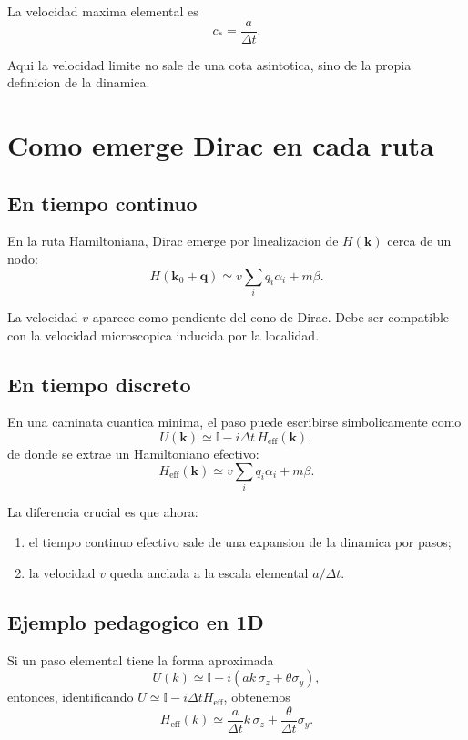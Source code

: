 La velocidad maxima elemental es
\begin{equation}
c_\ast = \frac{a}{\Delta t}.
\label{c20:eq:cstar}
\end{equation}

Aqui la velocidad limite no sale de una cota asintotica, sino de la propia definicion de la dinamica.

\section{Como emerge Dirac en cada ruta}
\subsection{En tiempo continuo}
En la ruta Hamiltoniana, Dirac emerge por linealizacion de \(H(\bm{k})\) cerca de un nodo:
\begin{equation}
H(\bm{k}_0+\bm{q}) \simeq v\sum_i q_i \alpha_i + m\beta.
\label{c20:eq:dirac-cont}
\end{equation}

La velocidad \(v\) aparece como pendiente del cono de Dirac. Debe ser compatible con la velocidad microscopica inducida por la localidad.

\subsection{En tiempo discreto}
En una caminata cuantica minima, el paso puede escribirse simbolicamente como
\begin{equation}
U(\bm{k}) \simeq \mathbb{I} - i\Delta t\,H_{\text{eff}}(\bm{k}),
\end{equation}
de donde se extrae un Hamiltoniano efectivo:
\begin{equation}
H_{\text{eff}}(\bm{k}) \simeq v\sum_i q_i \alpha_i + m\beta.
\label{c20:eq:dirac-disc}
\end{equation}

La diferencia crucial es que ahora:
\begin{enumerate}[label=\arabic*.]
    \item el tiempo continuo efectivo sale de una expansion de la dinamica por pasos;
    \item la velocidad \(v\) queda anclada a la escala elemental \(a/\Delta t\).
\end{enumerate}

\subsection{Ejemplo pedagogico en 1D}
Si un paso elemental tiene la forma aproximada
\begin{equation}
U(k)\simeq \mathbb{I} - i\left(ak\,\sigma_z + \theta \sigma_y\right),
\end{equation}
entonces, identificando \(U \simeq \mathbb{I} - i\Delta t H_{\text{eff}}\), obtenemos
\begin{equation}
H_{\text{eff}}(k)
\simeq
\frac{a}{\Delta t}k\,\sigma_z
+ \frac{\theta}{\Delta t}\sigma_y.
\label{c20:eq:qw-dirac}
\end{equation}

